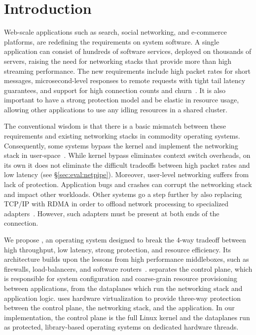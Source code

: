 
\section{Introduction}
\label{sec:intro}


Web-scale applications such as search, social networking, and
e-commerce platforms, are redefining the requirements on system
software. A single application can consist of hundreds of software
services, deployed on thousands of servers, raising the need for
networking stacks that provide more than high streaming performance.
The new requirements include high packet rates for short messages,
microsecond-level responses to remote requests with tight tail latency
guarantees, and support for high connection counts and
churn~\cite{Atikoglu:2012:WAL,DBLP:journals/cacm/DeanB13,DBLP:conf/nsdi/NishtalaFGKLLMPPSSTV13}.
It is also important to have a strong protection model and be elastic
in resource usage, allowing other applications to use any idling
resources in a shared
cluster. %

The conventional wisdom is that there is a basic mismatch between
these requirements and existing networking stacks in commodity
operating systems. Consequently, some systems bypass the kernel and
implement the networking stack in
user-space~\cite{jeong2014mtcp,DBLP:conf/cloud/KapoorPTVV12,sandstorm,openonload,DBLP:conf/sigcomm/ThekkathNML93}.
While kernel bypass eliminates context switch overheads, on its own it
does not eliminate the difficult tradeoffs between high packet rates
and low latency (see \S\ref{sec:eval:netpipe}). Moreover, user-level
networking suffers from lack of protection. Application bugs and
crashes can corrupt the networking stack and impact other workloads.
Other systems go a step further by also replacing TCP/IP with RDMA in
order to offload network processing to specialized
adapters~\cite{dragojevic14farm,DBLP:conf/icpp/JoseSLZHWIOWSP11,mitchell:rdma,DBLP:conf/sosp/OngaroRSOR11}.
However, such adapters must be present at both ends of the connection.


We propose \ix, an operating system designed to break the $4$-way
tradeoff between high throughput, low latency, strong protection, and
resource efficiency. Its architecture builds upon the lessons from
high performance middleboxes, such as firewalls, load-balancers, and
software routers~\cite{routebricks,click}. \ix separates the control
plane, which is responsible for system configuration and coarse-grain
resource provisioning between applications, from the dataplanes which
run the networking stack and application logic. \ix uses hardware
virtualization %
to provide three-way protection between the control plane, the
networking stack, and the application. In our implementation, the
control plane is the full Linux kernel and the dataplanes run as
protected, library-based operating systems on dedicated hardware
threads.

